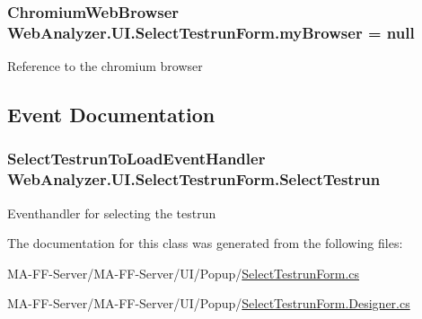 \hypertarget{class_web_analyzer_1_1_u_i_1_1_select_testrun_form_ac2ba9aef1d2ceece915af46662af8165}{}
\subsubsection[{my\+Browser}]{\setlength{\rightskip}{0pt plus 5cm}Chromium\+Web\+Browser Web\+Analyzer.\+U\+I.\+Select\+Testrun\+Form.\+my\+Browser = null\hspace{0.3cm}{\ttfamily [private]}}\label{class_web_analyzer_1_1_u_i_1_1_select_testrun_form_ac2ba9aef1d2ceece915af46662af8165}


Reference to the chromium browser 



\subsection{Event Documentation}
\hypertarget{class_web_analyzer_1_1_u_i_1_1_select_testrun_form_a21a81e06c20de7a18979a8c4c7ded945}{}
\subsubsection[{Select\+Testrun}]{\setlength{\rightskip}{0pt plus 5cm}Select\+Testrun\+To\+Load\+Event\+Handler Web\+Analyzer.\+U\+I.\+Select\+Testrun\+Form.\+Select\+Testrun}\label{class_web_analyzer_1_1_u_i_1_1_select_testrun_form_a21a81e06c20de7a18979a8c4c7ded945}


Eventhandler for selecting the testrun 



The documentation for this class was generated from the following files\+:\begin{DoxyCompactItemize}
\item 
M\+A-\/\+F\+F-\/\+Server/\+M\+A-\/\+F\+F-\/\+Server/\+U\+I/\+Popup/\hyperlink{_select_testrun_form_8cs}{Select\+Testrun\+Form.\+cs}\item 
M\+A-\/\+F\+F-\/\+Server/\+M\+A-\/\+F\+F-\/\+Server/\+U\+I/\+Popup/\hyperlink{_select_testrun_form_8_designer_8cs}{Select\+Testrun\+Form.\+Designer.\+cs}\end{DoxyCompactItemize}
